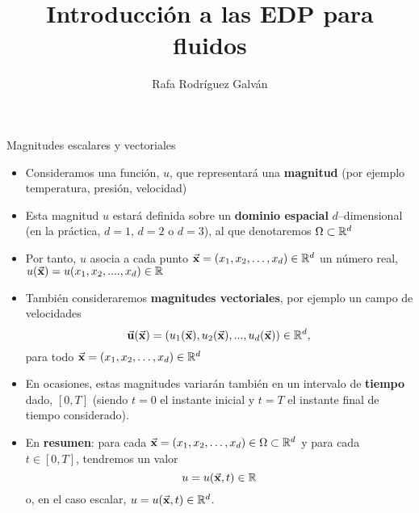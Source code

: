 \documentclass[9pt, dvipsnames,]{beamer}
\title{Introducción a las EDP para fluidos}
\author{Rafa Rodríguez Galván}
\begin{document}

\begin{frame}
\maketitle
\end{frame}

\begin{frame}{Magnitudes escalares y vectoriales}
  \begin{itemize}\itemsep0.5em
    \item Consideramos una función, $u$, que representará una \textbf{magnitud} (por ejemplo temperatura, presión, velocidad)
    \item Esta magnitud $u$ estará definida sobre un \textbf{dominio espacial} $d$--dimensional (en la práctica, $d=1$, $d=2$ o $d=3$), al que denotaremos $\Omega\subset{\mathbb R}^d$
  \item Por tanto, $u$ asocia a cada punto $\vec{\mathbf{x}}=(x_1,x_2,\dots,x_d)\in{\mathbb R}^d$ un número real, $u(\vec{\mathbf{x}})=u(x_1,x_2,....,x_d)\in{\mathbb R}$
  \item También consideraremos \textbf{magnitudes vectoriales}, por ejemplo un campo de velocidades
    $$\vec{\mathbf{u}}(\vec{\mathbf{x}}) =  (u_1(\vec{\mathbf{x}}), u_2(\vec{\mathbf{x}}),..., u_d(\vec{\mathbf{x}}))\in{\mathbb R}^d,$$ 
  para todo $\vec{\mathbf{x}}=(x_1,x_2,\dots,x_d)\in{\mathbb R}^d$
\item En ocasiones, estas magnitudes variarán también en un intervalo de \textbf{tiempo} dado, $[0,T]$ (siendo $t=0$ el instante inicial y $t=T$ el instante final de tiempo considerado).
\item 
  En \textbf{resumen}: para cada $\vec{\mathbf{x}}=(x_1,x_2,\dots,x_d)\in\Omega\subset{\mathbb R}^d$ y para cada $t\in [0,T]$, tendremos un valor 
  $$u=u(\vec{\mathbf{x}},t)\in{\mathbb R}$$ 
o, en el caso escalar, $u=u(\vec{\mathbf{x}},t)\in{\mathbb R}^d$.
\end{itemize}
\end{frame}
\end{document}
